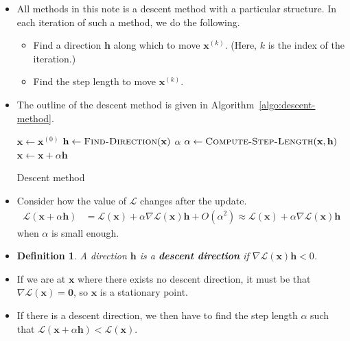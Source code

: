 \documentclass[10pt]{article}
\newtheorem{definition}[lemma]{Definition}
\newcommand{\ve}[1]{\mathbf{#1}}
\newcommand{\mcal}[1]{\mathcal{#1}}
\begin{document}
\begin{itemize}
    \item All methods in this note is a descent method with a particular structure. In each iteration of such a method, we do the following.
    \begin{itemize}
        \item Find a direction $\ve{h}$ along which to move $\ve{x}^{(k)}$. (Here, $k$ is the index of the iteration.)
        \item Find the step length to move $\ve{x}^{(k)}$.
    \end{itemize}
    
    \item The outline of the descent method is given in Algorithm~\ref{algo:descent-method}.
    
    \begin{algorithm}[t]
    \begin{algorithmic}
        \State $\ve{x} \gets \ve{x}^{(0)}$
            \State $\ve{h} \gets \Call{Find-Direction}{\ve{x}}$
            \If {(no such $\ve{h}$ exists)}
                \State \Return $\alpha$
            \Else
                \State $\alpha \gets \Call{Compute-Step-Length}{\ve{x}, \ve{h}}$
                \State $\ve{x} \gets \ve{x} + \alpha\ve{h}$            
            \EndIf
        \EndWhile
    \end{algorithmic}
    \caption{Descent method}
    \label{algo:descent-method}
    \end{algorithm}

    \item Consider how the value of $\mcal{L}$ changes after the update.
    \begin{align*}
        \mcal{L}(\ve{x} + \alpha \ve{h}) 
        &= \mcal{L}(\ve{x}) + \alpha \nabla \mcal{L}(\ve{x}) \ve{h} + O(\alpha^2) 
        \approx \mcal{L}(\ve{x}) + \alpha \nabla \mcal{L}(\ve{x}) \ve{h}
    \end{align*}
    when $\alpha$ is small enough. 
    
    \item \begin{definition}
        A direction $\ve{h}$ is a {\bf descent direction} if $\nabla \mcal{L}(\ve{x}) \ve{h} < 0$.
    \end{definition}

    \item If we are at $\ve{x}$ where there exists no descent direction, it must be that $\nabla \mcal{L}(\ve{x}) = \ve{0}$, so $\ve{x}$ is a stationary point.
    
    \item If there is a descent direction, we then have to find the step length $\alpha$ such that $\mcal{L}(\ve{x} + \alpha \ve{h}) < \mcal{L}(\ve{x}).$ 
\end{itemize}
\end{document}
